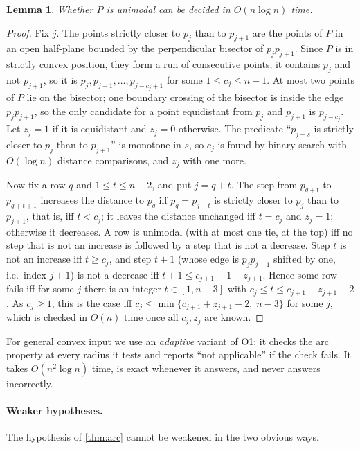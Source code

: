 \documentclass[11pt,a4paper]{article}
\newtheorem{lemma}[theorem]{Lemma}
\theoremstyle{definition}
\theoremstyle{remark}
\begin{document}
\begin{lemma}\label{lem:unitest}
Whether $P$ is unimodal can be decided in $O(n\log n)$ time.
\end{lemma}
\begin{proof}
Fix $j$. The points strictly closer to $p_j$ than to $p_{j+1}$ are the points
of $P$ in an open half-plane bounded by the perpendicular bisector of
$p_jp_{j+1}$. Since $P$ is in strictly convex position, they form a run of
consecutive points; it contains $p_j$ and not $p_{j+1}$, so it is
$p_j,p_{j-1},\dots,p_{j-c_j+1}$ for some $1\le c_j\le n-1$. At most two points
of $P$ lie on the bisector; one boundary crossing of the bisector is inside the
edge $p_jp_{j+1}$, so the only candidate for a point equidistant from $p_j$ and
$p_{j+1}$ is $p_{j-c_j}$. Let $z_j=1$ if it is equidistant and $z_j=0$
otherwise. The predicate ``$p_{j-s}$ is strictly closer to $p_j$ than to
$p_{j+1}$'' is monotone in $s$, so $c_j$ is found by binary search with
$O(\log n)$ distance comparisons, and $z_j$ with one more.

Now fix a row $q$ and $1\le t\le n-2$, and put $j=q+t$. The step from
$p_{q+t}$ to $p_{q+t+1}$ increases the distance to $p_q$ iff $p_q=p_{j-t}$ is
strictly closer to $p_j$ than to $p_{j+1}$, that is, iff $t<c_j$; it leaves the
distance unchanged iff $t=c_j$ and $z_j=1$; otherwise it decreases. A row is
unimodal (with at most one tie, at the top) iff no step that is not an
increase is followed by a step that is not a decrease. Step $t$ is not an
increase iff $t\ge c_j$, and step $t+1$ (whose edge is $p_{j}p_{j+1}$ shifted
by one, i.e.\ index $j+1$) is not a decrease iff $t+1\le c_{j+1}-1+z_{j+1}$.
Hence some row fails iff for some $j$ there is an integer
$t\in[1,n-3]$ with $c_j\le t\le c_{j+1}+z_{j+1}-2$. As $c_j\ge1$, this is the
case iff $c_j\le\min\{c_{j+1}+z_{j+1}-2,\;n-3\}$ for some $j$, which is
checked in $O(n)$ time once all $c_j,z_j$ are known.
\end{proof}

For general convex input we use an \emph{adaptive} variant of \textsc{O1}: it
checks the arc property at every radius it tests and reports ``not
applicable'' if the check fails. It takes $O(n^2\log n)$ time, is exact
whenever it answers, and never answers incorrectly.

\paragraph{Weaker hypotheses.}
The hypothesis of \cref{thm:arc} cannot be weakened in the two obvious ways.
\end{document}
